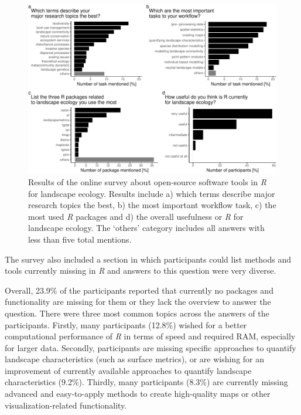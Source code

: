 \documentclass[smallextended]{svjour3}       %
\begin{document}
\begin{figure}

{\centering \includegraphics[width=\textwidth]{paper_files/figure-latex/fig-survey-1} 

}

\caption{Results of the online survey about open-source software tools in \emph{R} for landscape ecology. Results include a) which terms describe major research topics the best, b) the most important workflow task, c) the most used \emph{R} packages and d) the overall usefulness or \emph{R} for landscape ecology. The `others' category includes all answers with less than five total mentions.}\label{fig:fig-survey}
\end{figure}

The survey also included a section in which participants could list methods and tools currently missing in \emph{R} and answers to this question were very diverse.

Overall, 23.9\% of the participants reported that currently no packages and functionality are missing for them or they lack the overview to answer the question.
There were three most common topics across the answers of the participants.
Firstly, many participants (12.8\%) wished for a better computational performance of \emph{R} in terms of speed and required RAM, especially for larger data.
Secondly, participants are missing specific approaches to quantify landscape characteristics (such as surface metrics), or are wishing for an improvement of currently available approaches to quantify landscape characteristics (9.2\%).
Thirdly, many participants (8.3\%) are currently missing advanced and easy-to-apply methods to create high-quality maps or other visualization-related functionality.
\end{document}
